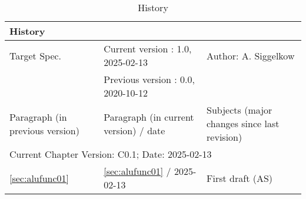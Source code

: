 \begin{table}[H]
\caption{History}
\label{tab:aluhistory02}
\centering
\begin{tabularx}{\textwidth}{|X |X |X |}
  \hline
  \multicolumn{3}{|l|}{History} \\
  \hline
  \multicolumn{1}{|l}{Target Spec.} & \multicolumn{1}{l}{Current version : 1.0, 2025-02-13} & \multicolumn{1}{l|}{Author: A. Siggelkow}\\
  \multicolumn{1}{|l}{ } & \multicolumn{1}{l}{Previous version : 0.0, 2020-10-12} & \multicolumn{1}{l|}{ }\\
  \hline
  \hline
  Paragraph (in previous version) & Paragraph (in current version) / date & Subjects (major changes since last revision) \\
  \hline
  \hline
  \multicolumn{3}{|l|}{Current Chapter Version: C0.1; Date: 2025-02-13} \\
  \hline
  \ref{sec:alufunc01} & \ref{sec:alufunc01} / 2025-02-13 & First draft (AS) \\
  \hline
\end{tabularx}
\end{table}
